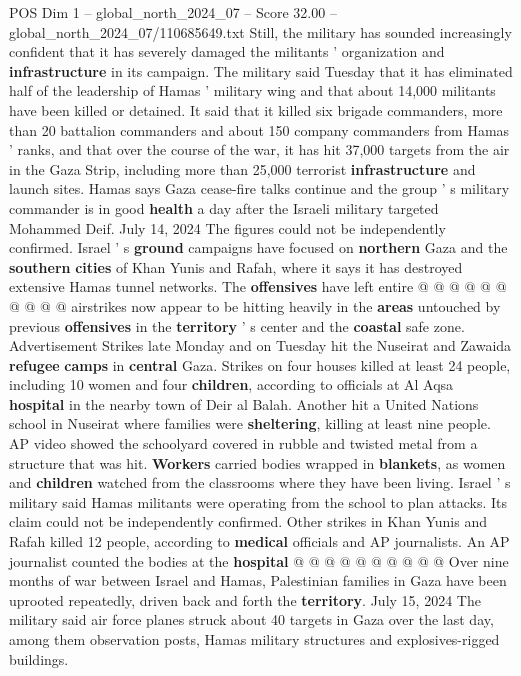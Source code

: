 \begin{textsample}{POS Dim 1 – global\_north\_2024\_07 – Score 32.00 – global\_north\_2024\_07/110685649.txt}
Still, the military has sounded increasingly confident that it has severely damaged the militants ' organization and \textbf{infrastructure} in its campaign.
The military said Tuesday that it has eliminated half of the leadership of Hamas ' military wing and that about 14,000 militants have been killed or detained.
It said that it killed six brigade commanders, more than 20 battalion commanders and about 150 company commanders from Hamas ' ranks, and that over the course of the war, it has hit 37,000 targets from the air in the Gaza Strip, including more than 25,000 terrorist \textbf{infrastructure} and launch sites.
Hamas says Gaza cease-fire talks continue and the group ' s military commander is in good \textbf{health} a day after the Israeli military targeted Mohammed Deif.
July 14, 2024 The figures could not be independently confirmed.
Israel ' s \textbf{ground} campaigns have focused on \textbf{northern} Gaza and the \textbf{southern} \textbf{cities} of Khan Yunis and Rafah, where it says it has destroyed extensive Hamas tunnel networks.
The \textbf{offensives} have left entire @ @ @ @ @ @ @ @ @ @ airstrikes now appear to be hitting heavily in the \textbf{areas} untouched by previous \textbf{offensives} in the \textbf{territory} ' s center and the \textbf{coastal} safe zone.
Advertisement Strikes late Monday and on Tuesday hit the Nuseirat and Zawaida \textbf{refugee} \textbf{camps} in \textbf{central} Gaza.
Strikes on four houses killed at least 24 people, including 10 women and four \textbf{children}, according to officials at Al Aqsa \textbf{hospital} in the nearby town of Deir al Balah.
Another hit a United Nations school in Nuseirat where families were \textbf{sheltering}, killing at least nine people.
AP video showed the schoolyard covered in rubble and twisted metal from a structure that was hit. \textbf{Workers} carried bodies wrapped in \textbf{blankets}, as women and \textbf{children} watched from the classrooms where they have been living.
Israel ' s military said Hamas militants were operating from the school to plan attacks.
Its claim could not be independently confirmed.
Other strikes in Khan Yunis and Rafah killed 12 people, according to \textbf{medical} officials and AP journalists.
An AP journalist counted the bodies at the \textbf{hospital} @ @ @ @ @ @ @ @ @ @ Over nine months of war between Israel and Hamas, Palestinian families in Gaza have been uprooted repeatedly, driven back and forth the \textbf{territory}.
July 15, 2024 The military said air force planes struck about 40 targets in Gaza over the last day, among them observation posts, Hamas military structures and explosives-rigged buildings.

\end{textsample}
